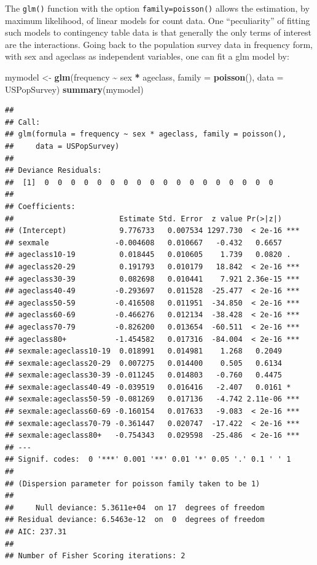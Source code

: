 \documentclass[
  12pt,
]{book}
\newenvironment{Shaded}{\begin{snugshade}}{\end{snugshade}}
\newcommand{\DataTypeTok}[1]{\textcolor[rgb]{0.13,0.29,0.53}{#1}}
\newcommand{\KeywordTok}[1]{\textcolor[rgb]{0.13,0.29,0.53}{\textbf{#1}}}
\newcommand{\NormalTok}[1]{#1}
\newcommand{\OperatorTok}[1]{\textcolor[rgb]{0.81,0.36,0.00}{\textbf{#1}}}
\newcommand{\StringTok}[1]{\textcolor[rgb]{0.31,0.60,0.02}{#1}}
\begin{document}
The \texttt{glm()} function with the option \texttt{family=poisson()} allows the estimation, by maximum likelihood, of linear models for count data. One ``peculiarity'' of fitting such models to contingency table data is that generally the only terms of interest are the interactions. Going back to the population survey data in frequency form, with sex and ageclass as independent variables, one can fit a glm model by:

\begin{Shaded}
\begin{Highlighting}[]
\NormalTok{mymodel \textless{}{-}}\StringTok{ }\KeywordTok{glm}\NormalTok{(frequency }\OperatorTok{\textasciitilde{}}\StringTok{ }\NormalTok{sex }\OperatorTok{*}\StringTok{ }\NormalTok{ageclass, }\DataTypeTok{family =} \KeywordTok{poisson}\NormalTok{(), }\DataTypeTok{data =}\NormalTok{ USPopSurvey)}
\KeywordTok{summary}\NormalTok{(mymodel)}
\end{Highlighting}
\end{Shaded}

\begin{verbatim}
## 
## Call:
## glm(formula = frequency ~ sex * ageclass, family = poisson(), 
##     data = USPopSurvey)
## 
## Deviance Residuals: 
##  [1]  0  0  0  0  0  0  0  0  0  0  0  0  0  0  0  0  0  0
## 
## Coefficients:
##                        Estimate Std. Error  z value Pr(>|z|)    
## (Intercept)            9.776733   0.007534 1297.730  < 2e-16 ***
## sexmale               -0.004608   0.010667   -0.432   0.6657    
## ageclass10-19          0.018445   0.010605    1.739   0.0820 .  
## ageclass20-29          0.191793   0.010179   18.842  < 2e-16 ***
## ageclass30-39          0.082698   0.010441    7.921 2.36e-15 ***
## ageclass40-49         -0.293697   0.011528  -25.477  < 2e-16 ***
## ageclass50-59         -0.416508   0.011951  -34.850  < 2e-16 ***
## ageclass60-69         -0.466276   0.012134  -38.428  < 2e-16 ***
## ageclass70-79         -0.826200   0.013654  -60.511  < 2e-16 ***
## ageclass80+           -1.454582   0.017316  -84.004  < 2e-16 ***
## sexmale:ageclass10-19  0.018991   0.014981    1.268   0.2049    
## sexmale:ageclass20-29  0.007275   0.014400    0.505   0.6134    
## sexmale:ageclass30-39 -0.011245   0.014803   -0.760   0.4475    
## sexmale:ageclass40-49 -0.039519   0.016416   -2.407   0.0161 *  
## sexmale:ageclass50-59 -0.081269   0.017136   -4.742 2.11e-06 ***
## sexmale:ageclass60-69 -0.160154   0.017633   -9.083  < 2e-16 ***
## sexmale:ageclass70-79 -0.361447   0.020747  -17.422  < 2e-16 ***
## sexmale:ageclass80+   -0.754343   0.029598  -25.486  < 2e-16 ***
## ---
## Signif. codes:  0 '***' 0.001 '**' 0.01 '*' 0.05 '.' 0.1 ' ' 1
## 
## (Dispersion parameter for poisson family taken to be 1)
## 
##     Null deviance: 5.3611e+04  on 17  degrees of freedom
## Residual deviance: 6.5463e-12  on  0  degrees of freedom
## AIC: 237.31
## 
## Number of Fisher Scoring iterations: 2
\end{verbatim}
\end{document}
